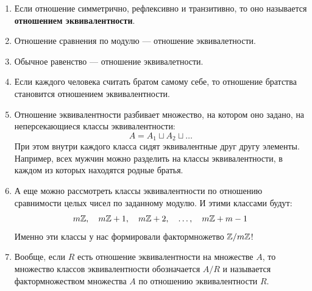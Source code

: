 \begin{enumerate}
\begin{enumerate}[R1]
\end{enumerate}
\item Если отношение симметрично, рефлексивно и транзитивно, то оно называется \textbf{отношением эквивалентности}.
\item Отношение сравнения по модулю --- отношение эквивалетности.
\item Обычное равенство --- отношение эквивалетности.
\item Если каждого человека считать братом самому себе, то отношение братства становится отношением эквивалентности.
\item Отношение эквивалентности разбивает множество, на котором оно задано, на неперсекающиеся классы эквивалентности:
$$
A = A_1\sqcup A_2\sqcup\dots
$$
При этом внутри каждого класса сидят эквивалентные друг другу элементы. Например, всех мужчин можно разделить на классы эквивалентности, в каждом из которых находятся родные братья.
\item А еще можно рассмотреть классы эквивалентности по отношению сравнимости целых чисел по заданному модулю. И этими классами будут:
$$
m\mathbb Z,\quad m\mathbb Z+1,\quad m\mathbb Z+2,\quad\dots,\quad m\mathbb Z+m-1
$$
Именно эти классы у нас формировали фактормножетво $\mathbb Z/m\mathbb Z$!
\item Вообще, если $R$ есть отношение эквивалентности на множестве $A$, то множество классов эквивалентности обозначается $A/R$ и называется фактормножеством множества $A$ по отношению эквивалентности $R$.
\end{enumerate}


